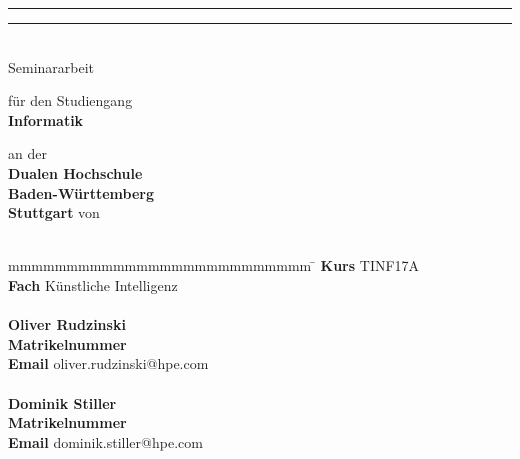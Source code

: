\makeatletter
\begin{center}
	\rule{\linewidth}{1pt}
	{
		\Huge \bfseries
			\@title
		
		\par	
	}
	\vspace{0.2cm}
	\rule{\linewidth}{1pt} \\
	
    \vfill
	Seminararbeit
	\vfill
	
	für den Studiengang \\ \textbf{Informatik}
	
	an der \\ \textbf{Dualen Hochschule \\Baden-Württemberg\\Stuttgart}
	\vfill
	von \\ \textbf{\textsc{\@author}} \\
\end{center}

\vfill\vfill

\begin{tabbing}
	mmmmmmmmmmmmmmmmmmmmmmmmmm				\= \kill
	\textbf{Kurs} \> TINF17A \\
	\textbf{Fach} \> Künstliche Intelligenz \\ \\
	
	\textbf{Oliver Rudzinski} \>   \\ 
	\textbf{Matrikelnummer}  \\ 
	\textbf{Email} \>  oliver.rudzinski@hpe.com \\ \\

	\textbf{Dominik Stiller}  \> \\ 
	\textbf{Matrikelnummer} \\ 
	\textbf{Email} \>  dominik.stiller@hpe.com \\ 
\end{tabbing}
